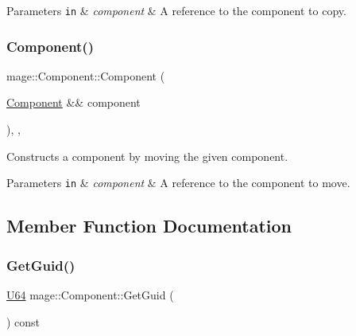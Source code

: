 \begin{DoxyParams}[1]{Parameters}
\mbox{\tt in}  & {\em component} & A reference to the component to copy. \\
\hline
\end{DoxyParams}
\mbox{\label{classmage_1_1_component_a3abb21d27d4e89513787396c27b0ff6d}} 
\subsubsection{\texorpdfstring{Component()}{Component()}\hspace{0.1cm}{\footnotesize\ttfamily [3/3]}}
{\footnotesize\ttfamily mage\+::\+Component\+::\+Component (\begin{DoxyParamCaption}\item[{\mbox{\hyperlink{classmage_1_1_component}{Component}} \&\&}]{component }\end{DoxyParamCaption})\hspace{0.3cm}{\ttfamily [protected]}, {\ttfamily [default]}, {\ttfamily [noexcept]}}

Constructs a component by moving the given component.


\begin{DoxyParams}[1]{Parameters}
\mbox{\tt in}  & {\em component} & A reference to the component to move. \\
\hline
\end{DoxyParams}


\subsection{Member Function Documentation}
\mbox{\label{classmage_1_1_component_a1af8d5d8d09e5de54851ebed22153571}} 
\subsubsection{\texorpdfstring{Get\+Guid()}{GetGuid()}}
{\footnotesize\ttfamily \mbox{\hyperlink{namespacemage_a6672cf3c861707ce4a3235a3eb43941d}{U64}} mage\+::\+Component\+::\+Get\+Guid (\begin{DoxyParamCaption}{ }\end{DoxyParamCaption}) const\hspace{0.3cm}{\ttfamily [noexcept]}}

